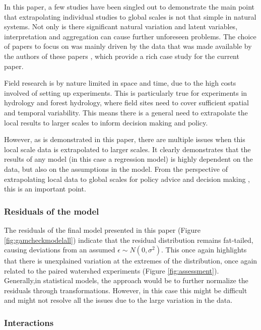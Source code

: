 \documentclass[]{elsarticle} %
\begin{document}
In this paper, a few studies have been singled out to demonstrate the main point that extrapolating individual studies to global scales is not that simple in natural systems. Not only is there significant natural variation and latent variables, interpretation and aggregation can cause further unforeseen problems. The choice of papers to focus on was mainly driven by the data that was made available by the authors of these papers \citep{zhang2017, filoso2017}, which provide a rich case study for the current paper.

Field research is by nature limited in space and time, due to the high costs involved of setting up experiments. This is particularly true for experiments in hydrology and forest hydrology, where field sites need to cover sufficient spatial and temporal variability. This means there is a general need to extrapolate the local results to larger scales to inform decision making and policy.

However, as is demonstrated in this paper, there are multiple issues when this local scale data is extrapolated to larger scales. It clearly demonstrates that the results of any model (in this case a regression model) is highly dependent on the data, but also on the assumptions in the model. From the perspective of extrapolating local data to global scales for policy advice and decision making \citep[i.e.][]{hoekvandijke2022, jackson2005}, this is an important point.

\hypertarget{residuals-of-the-model}{%
\subsubsection{Residuals of the model}\label{residuals-of-the-model}}

The residuals of the final model presented in this paper (Figure \ref{fig:gamcheckmodelall}) indicate that the residual distribution remains fat-tailed, causing deviations from an assumed \(\epsilon \sim N(0,\sigma^2)\). This once again highlights that there is unexplained variation at the extremes of the distribution, once again related to the paired watershed experiments (Figure \ref{fig:assessment}). Generally,in statistical models, the approach would be to further normalize the residuals through transformations. However, in this case this might be difficult and might not resolve all the issues due to the large variation in the data.

\hypertarget{interactions}{%
\subsubsection{Interactions}\label{interactions}}
\end{document}
